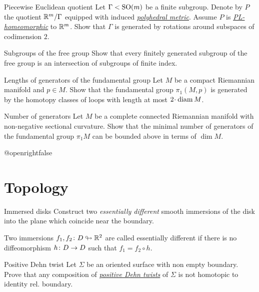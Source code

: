\documentclass[twoside]{book}
\begin{document}
{{}

\begin{pr}{\easy}{Piecewise Euclidean quotient}\label{Piecewise Euclidean quotient}
Let $\Gamma<\mathrm{SO}(m)$ be a finite subgroup.
Denote by $P$ the quotient $\mathbb{R}^m/\Gamma$ equipped with induced
\hyperref[Polyhedral space]{\emph{polyhedral metric}}.
Assume $P$ is \hyperref[PL-homeomorphism]{\emph{PL-homeomorphic}} to $\mathbb{R}^m$.
Show that $\Gamma$ is generated by rotations  around subspaces of codimension $2$.
\end{pr}

\begin{pr}{\easy}{Subgroups of the free group}\label{Subgroups of free group} 
Show that every finitely generated subgroup of the free group 
is an intersection of subgroups of finite index.
\end{pr}

\begin{pr}{\easy}{Lengths of generators of the fundamental group}\label{Lengths of generators of the fundamental group}
Let $M$ be a compact Riemannian manifold and $p\in M$.
Show that the fundamental group $\pi_1(M,p)$
is generated by the homotopy classes of loops with length at most $2\cdot\diam M$.
\end{pr}

\begin{pr}{}{Number of generators}\label{Number of generators}
Let $M$ be a complete connected Riemannian manifold with non-negative sectional curvature.
Show that the minimal number of generators of the fundamental group $\pi_1 M$
can be bounded above in terms of $\dim M$.
\end{pr}

\csname @openrightfalse\endcsname
\chapter{Topology}

\begin{pr}{}{Immersed disks}\label{Immersed disks} 
Construct two \emph{essentially different} smooth immersions of the disk 
into the plane which coincide near the boundary. 

Two immersions $f_1,f_2\colon D\looparrowright \mathbb{R}^2$ are called essentially different 
if there is no diffeomorphism $h\:D\z\to D$ such that
$f_1=f_2\circ h$.
\end{pr}

\begin{pr}{\easy}{Positive Dehn twist}\label{Positive Dehn twist} Let $\Sigma$ be an oriented surface with non empty boundary.
Prove that any composition of \hyperref[Dehn twist]{\emph{positive Dehn twists}} of $\Sigma$ is not homotopic to identity rel. boundary.
\end{pr}

}
\end{document}
